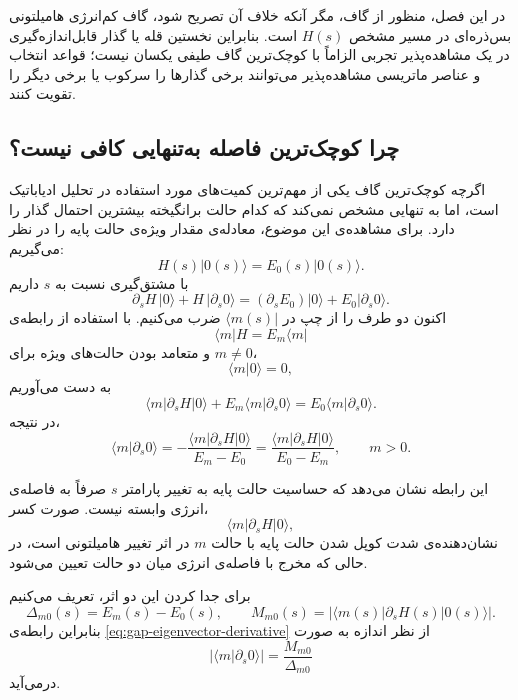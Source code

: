 در این فصل، منظور از گاف، مگر آنکه خلاف آن تصریح شود، گاف کم‌انرژی
هامیلتونی بس‌ذره‌ای در مسیر مشخص $H(s)$ است. بنابراین نخستین
قله یا گذار قابل‌اندازه‌گیری در یک مشاهده‌پذیر تجربی الزاماً با
کوچک‌ترین گاف طیفی یکسان نیست؛ قواعد انتخاب و عناصر ماتریسی
مشاهده‌پذیر می‌توانند برخی گذارها را سرکوب یا برخی دیگر را تقویت
کنند.

\subsection{چرا کوچک‌ترین فاصله به‌تنهایی کافی نیست؟}
\label{subsec:gap-not-sufficient}

اگرچه کوچک‌ترین گاف یکی از مهم‌ترین کمیت‌های مورد استفاده در
تحلیل ادیاباتیک است، اما به تنهایی مشخص نمی‌کند که کدام حالت
بر‌انگیخته بیشترین احتمال گذار را دارد. برای مشاهده‌ی این موضوع،
معادله‌ی مقدار ویژه‌ی حالت پایه را در نظر می‌گیریم:
\begin{equation}
	H(s)|0(s)\rangle
	=
	E_0(s)|0(s)\rangle.
	\label{eq:ground-state-eigenvalue}
\end{equation}
با مشتق‌گیری نسبت به $s$ داریم
\begin{equation}
	\partial_s H\,|0\rangle
	+
	H\,|\partial_s0\rangle
	=
	(\partial_sE_0)|0\rangle
	+
	E_0|\partial_s0\rangle.
\end{equation}
اکنون دو طرف را از چپ در $\langle m(s)|$ ضرب می‌کنیم. با استفاده
از رابطه‌ی
\[
\langle m|H=E_m\langle m|
\]
و متعامد بودن حالت‌های ویژه برای $m\neq0$،
\[
\langle m|0\rangle=0,
\]
به دست می‌آوریم
\begin{equation}
	\langle m|\partial_sH|0\rangle
	+
	E_m\langle m|\partial_s0\rangle
	=
	E_0\langle m|\partial_s0\rangle.
\end{equation}
در نتیجه،
\begin{equation}
	\langle m|\partial_s0\rangle
	=
	-\frac{\langle m|\partial_sH|0\rangle}
	{E_m-E_0}
	=
	\frac{\langle m|\partial_sH|0\rangle}
	{E_0-E_m},
	\qquad m>0.
	\label{eq:gap-eigenvector-derivative}
\end{equation}

این رابطه نشان می‌دهد که حساسیت حالت پایه به تغییر پارامتر $s$
صرفاً به فاصله‌ی انرژی وابسته نیست. صورت کسر،
\[
\langle m|\partial_sH|0\rangle,
\]
نشان‌دهنده‌ی شدت کوپل شدن حالت پایه با حالت $m$ در اثر تغییر
هامیلتونی است، در حالی که مخرج با فاصله‌ی انرژی میان دو حالت تعیین
می‌شود.

برای جدا کردن این دو اثر، تعریف می‌کنیم
\begin{equation}
	\Delta_{m0}(s)
	=
	E_m(s)-E_0(s),
	\qquad
	M_{m0}(s)
	=
	\left|
	\langle m(s)|\partial_sH(s)|0(s)\rangle
	\right|.
	\label{eq:gap-and-matrix-element}
\end{equation}
بنابراین رابطه‌ی \eqref{eq:gap-eigenvector-derivative} از نظر
اندازه به صورت
\begin{equation}
	\left|
	\langle m|\partial_s0\rangle
	\right|
	=
	\frac{M_{m0}}{\Delta_{m0}}
	\label{eq:eigenvector-sensitivity}
\end{equation}
درمی‌آید.

